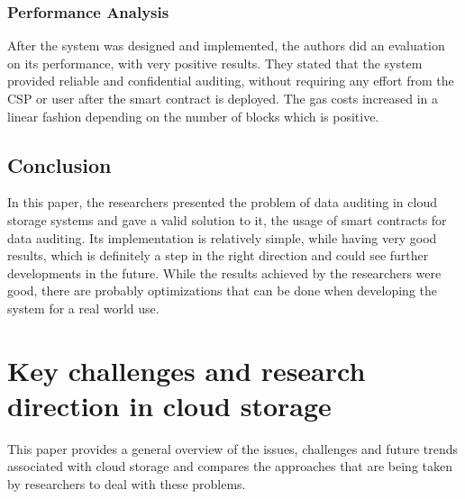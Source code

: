 \documentclass[14pt,oneside]{extreport}
\newcommand*\fpar{\hspace{1ex}}
\begin{document}
\subsection{Performance Analysis}
After the system was designed and implemented, the authors did an evaluation on its performance, with very positive results. They stated that the system provided reliable and confidential auditing, without requiring any effort from the CSP or user after the smart contract is deployed. The gas costs increased in a linear fashion depending on the number of blocks which is positive.
\section{Conclusion}
In this paper, the researchers presented the problem of data auditing in cloud storage systems and gave a valid solution to it, the usage of smart contracts for data auditing. Its implementation is relatively simple, while having very good results, which is definitely a step in the right direction and could see further developments in the future. While the results achieved by the researchers were good, there are probably optimizations that can be done when developing the system for a real world use.

\chapter{\Large{Key challenges and research direction in cloud storage \cite{paper5}}}
\fpar This paper provides a general overview of the issues, challenges and future trends associated with cloud storage and compares the approaches that are being taken by researchers to deal with these problems.
\end{document}
